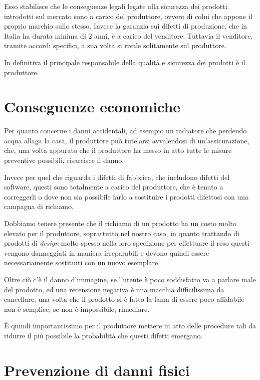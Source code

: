 \documentclass[12pt,a4paper,twoside,titlepage]{book}
\begin{document}
Esso stabilisce che le conseguenze legali legate alla sicurezza dei prodotti introdotti sul mercato 
sono a carico del \gls{produttore}, ovvero di colui che appone il proprio marchio sullo stesso. 
Invece la garanzia sui difetti di produzione, che in Italia ha durata minima di 2 anni, è a carico 
del venditore. Tuttavia il venditore, tramite accordi specifici, a sua volta si rivale solitamente 
sul produttore. 

In definitiva il principale responsabile della qualità e sicurezza dei prodotti è il produttore.

\section{Conseguenze economiche}

Per quanto concerne i danni accidentali, ad esempio un radiatore che perdendo acqua allaga la casa,
il produttore può tutelarsi avvalendosi di un'assicurazione, che, una volta appurato che il produttore
ha messo in atto tutte le misure preventive possibili, risarcisce il danno. 

Invece per quel che riguarda i difetti di fabbrica, che includono difetti del software, questi sono 
totalmente a carico del produttore, che è tenuto a correggerli o dove non sia possibile farlo a sostituire 
i prodotti difettosi con una campagna di richiamo. 

Dobbiamo tenere presente che il richiamo di un prodotto ha un costo molto elevato per il produttore, soprattutto 
nel nostro caso, in quanto trattando di prodotti di \textit{design} molto spesso nella loro spedizione per 
effettuare il reso questi vengono danneggiati in maniera irreparabili e devono quindi essere necessariamente 
sostituiti con un nuovo esemplare. 

Oltre ciò c'è il danno d'immagine, se l'utente è poco soddisfatto va a parlare male del prodotto, ed una 
recensione negativa è una macchia difficilissima da cancellare, una volta che il prodotto si è fatto la fama 
di essere poco affidabile non è semplice, se non è impossibile, rimediare. 

È quindi importantissimo per il produttore mettere in atto delle procedure tali da ridurre il più 
possibile la probabilità che questi difetti emergano.

\section{Prevenzione di danni fisici}
\end{document}
